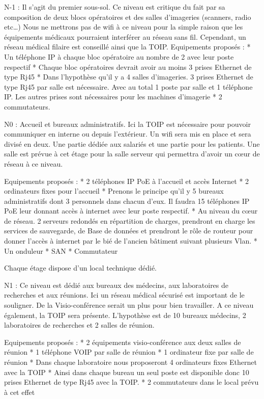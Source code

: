 N-1 : Il s’agit du premier sous-sol. Ce niveau est critique du fait par sa composition de deux blocs opératoires et des salles d’imageries (scanners, radio etc…) Nous ne mettrons pas de wifi à ce niveau pour la simple raison que les équipements médicaux pourraient interférer au réseau sans fil. Cependant, un réseau médical filaire est conseillé ainsi que la TOIP.
Equipements proposés :
* Un téléphone IP à chaque bloc opératoire au nombre de 2 avec leur poste respectif
* Chaque bloc opératoires devrait avoir au moins 3 prises Ethernet de type Rj45
* Dans l’hypothèse qu’il y a 4 salles d’imageries. 3 prises Ethernet de type Rj45 par salle est nécessaire. Avec au total 1 poste par salle et 1 téléphone IP. Les autres prises sont nécessaires pour les machines d’imagerie
* 2 commutateurs.


N0 : Accueil et bureaux administratifs. Ici la TOIP est nécessaire pour pouvoir communiquer en interne ou depuis l’extérieur. Un wifi sera mis en place et sera divisé en deux. Une partie dédiée aux salariés et une partie pour les patients. Une salle est prévue à cet étage pour la salle serveur qui permettra d’avoir un cœur de réseau à ce niveau.


Equipements proposés :
* 2 téléphones IP PoE à l’accueil et accès Internet
* 2 ordinateurs fixes pour l’accueil
* Prenons le principe qu’il y 5 bureaux administratifs dont 3 personnels dans chacun d’eux. Il faudra 15 téléphones IP PoE leur donnant accès à internet avec leur poste respectif.
* Au niveau du cœur de réseau. 2 serveurs redondés en répartition de charges, prendront en charge les services de sauvegarde, de Base de données et prendront le rôle de routeur pour donner l’accès à internet par le bié de l’ancien bâtiment suivant plusieurs Vlan.
* Un onduleur
* SAN
* Commutateur


Chaque étage dispose d'un local technique dédié.


N1 : Ce niveau est dédié aux bureaux des médecins, aux laboratoires de recherches et aux réunions. Ici un réseau médical sécurisé est important de le souligner. De la Visio-conférence serait un plus pour bien travailler. A ce niveau également, la TOIP sera présente. L’hypothèse est de 10 bureaux médecins, 2 laboratoires de recherches et 2 salles de réunion.


Equipements proposés :
* 2 équipements visio-conférence aux deux salles de réunion
* 1 téléphone VOIP par salle de réunion
* 1 ordinateur fixe par salle de réunion
* Dans chaque laboratoire nous proposeront 4 ordinateurs fixes  Ethernet avec la TOIP
* Ainsi dans chaque bureau un seul poste est disponible donc 10 prises Ethernet de type Rj45 avec la TOIP.
* 2 commutateurs dans le local prévu à cet effet




